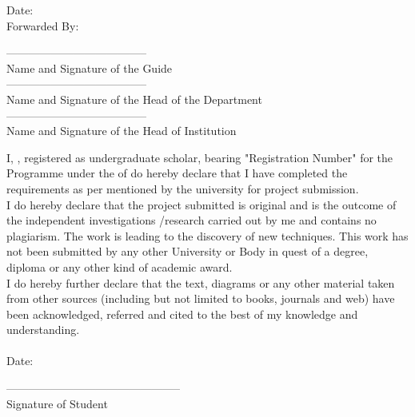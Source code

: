 \documentclass{article}
\begin{document}
\vspace{20.00mm}

\begin{minipage}{0.49\textwidth}
		\begin{flushleft}
			{Date:\\ [30px]
             \newblock
			Forwarded By:}
		\end{flushleft}
\end{minipage}
\begin{minipage}{0.49\textwidth}
	\begin{flushleft} \large
			{--------------------------------------\\[3px]
			Name and Signature of the Guide\\[3px]
			--------------------------------------\\[3px]
            Name and Signature of the Head of the Department\\[3px]
            --------------------------------------\\[3px]
            Name and Signature of the Head of Institution\\[3px]
			}
	\end{flushleft}		
\end{minipage}
\vfill

I, \authornames, registered as undergraduate scholar, bearing "Registration Number" for the \degreename Programme under the \DEPTNAME of \univname do hereby declare that I have completed the requirements as per mentioned by the university for project submission. \\
I do hereby declare that the project submitted is original and is the outcome of the independent investigations /research carried out by me and contains no plagiarism. The work is leading to the discovery of new techniques. This work has not been submitted by any other University or Body in quest of a degree, diploma or any other kind of academic award. \\
I do hereby further declare that the text, diagrams or any other material taken from other sources (including but not limited to books, journals and web) have been acknowledged, referred and cited to the best of my knowledge and understanding. \\ \\

Date:
\begin{flushright}
-----------------------------------------------\\
Signature of Student \\
\end{flushright}
\vfill
\end{document}
